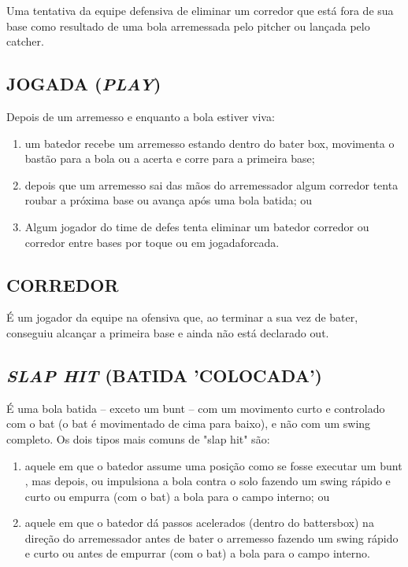 Uma tentativa da equipe defensiva de eliminar um corredor que está fora de sua base como resultado de uma bola arremessada pelo \gls{pitcher} ou lançada pelo
\gls{catcher}.

\subsection{JOGADA (\textit{PLAY})}

Depois de um arremesso e enquanto a bola estiver viva:

\begin{enumerate}[label=(\alph*)]
	\item   um batedor recebe um arremesso estando dentro do bater box, movimenta o bastão para a bola ou a acerta e corre para a primeira base;
	\item  depois que um arremesso sai das mãos do arremessador algum corredor tenta  roubar a próxima base ou avança após uma bola batida; ou
	\item  Algum jogador do time de defes tenta eliminar um batedor corredor ou corredor entre bases por toque ou em \gls{jogadaforcada}.
\end{enumerate}

\subsection{CORREDOR}
É um jogador da equipe na ofensiva que, ao terminar a sua vez de bater, conseguiu alcançar a primeira base e ainda não está declarado \gls{out}.

\subsection{\textit{SLAP HIT} (BATIDA 'COLOCADA')}

É uma bola batida -- exceto um \gls{bunt}  -- com um movimento curto e controlado com o \gls{bat} (o \gls{bat} é movimentado de cima para baixo), e não com um \gls{swing} completo. Os dois tipos mais comuns de "slap hit" são:

\begin{enumerate}[label=(\alph*)]\item   aquele em que o batedor assume uma posição como se fosse executar um \gls{bunt} , mas depois, ou impulsiona a bola contra o solo fazendo um \gls{swing} rápido e curto ou empurra (com o \gls{bat}) a bola para o campo interno; ou
	\item  aquele em que o batedor dá passos acelerados (dentro do \gls{battersbox}) na  direção do arremessador antes de bater o arremesso fazendo um \gls{swing} rápido e curto ou antes de empurrar (com o \gls{bat}) a bola para o campo interno.
\end{enumerate}

